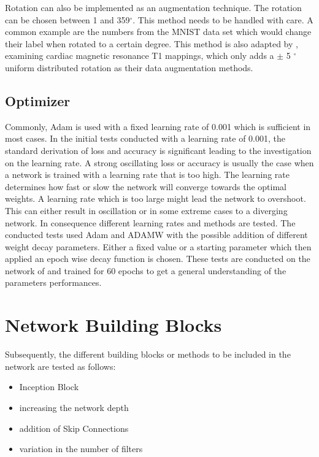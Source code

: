 \documentclass[
a4paper, 
12pt,
grayscalebody, %
abstract=on,
twoside, BCOR10mm, 12pt, DIV13,headinclude, footexclude, final, abstracton, openright
]{ibireprt}
\numberwithin{equation}{chapter}
\numberwithin{table}{chapter}
\numberwithin{figure}{chapter}
\numberwithin{algorithm}{chapter}
\numberwithin{example}{chapter}
\numberwithin{example}{chapter}
\begin{document}
Rotation can also be implemented as an augmentation technique. The rotation can be chosen between 1 and 359$^\circ$. This method needs to be handled with care. A common example are the numbers from the MNIST data set which would change their label when rotated to a certain degree. This method is also adapted by \citet{Zhang2020}, examining cardiac magnetic resonance T1 mappings, which only adds a $\pm$ 5 $^\circ$ uniform distributed rotation as their data augmentation methods. 



\subsection{Optimizer}
Commonly, Adam is used with a fixed learning rate of 0.001 which is sufficient in most cases. In the initial tests conducted with a learning rate of 0.001, the standard derivation of loss and accuracy is significant leading to the investigation on the learning rate. A strong oscillating loss or accuracy is usually the case when a network is trained with a learning rate that is too high. The learning rate determines how fast or slow the network will converge towards the optimal weights. A learning rate which is too large might lead the network to overshoot. This can either result in oscillation or in some extreme cases to a diverging network. In consequence different learning rates and methods are tested. The conducted tests used Adam and ADAMW with the possible addition of different weight decay parameters. Either a fixed value or a starting parameter which then applied an epoch wise decay function is chosen. These tests are conducted on the network of \citet{Walle2023} and trained for 60 epochs to get a general understanding of the parameters performances.


\section{Network Building Blocks}
Subsequently, the different building blocks or methods to be included in the network are tested as follows:

\begin{itemize}
	\item Inception Block 
	\item increasing the network depth
	\item addition of Skip Connections
	\item variation in the number of filters
\end{itemize}
\end{document}
